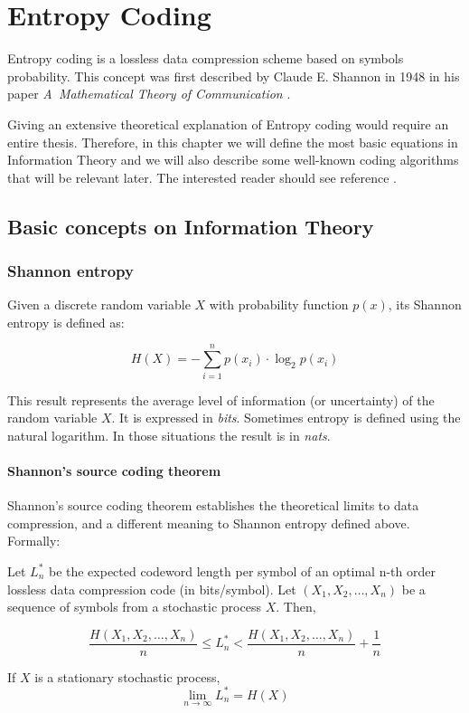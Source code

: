 \chapter{Entropy Coding}
Entropy coding is a lossless data compression scheme based on symbols probability. This concept was first described by Claude E. Shannon in 1948 in his paper \textit{A~Mathematical Theory of Communication} \parencite{Shannon1948}.

Giving an extensive theoretical explanation of Entropy coding would require an entire thesis. Therefore, in this chapter we will define the most basic equations in Information Theory and we will also describe some well-known coding algorithms that will be relevant later. The interested reader should see reference \parencite{cover}.

\section{Basic concepts on Information Theory}
\subsection{Shannon entropy}
Given a discrete random variable $X$ with probability function $p(x)$, its Shannon entropy is defined as:

\begin{equation}
H(X) = - \sum_{i=1}^{n} p(x_i) \cdot \log_2 p(x_i) 
\end{equation}

This result represents the average level of information (or uncertainty) of the random variable $X$. It is expressed in \textit{bits}. Sometimes entropy is defined using the natural logarithm. In those situations the result is in \textit{nats}.

\subsubsection{Shannon's source coding theorem}
Shannon's source coding theorem establishes the theoretical limits to data compression, and a different meaning to Shannon entropy defined above. Formally:

\begin{theorem}
Let $L_n^*$ be the expected codeword length per symbol of an optimal n-th order lossless data compression code (in bits/symbol). Let $(X_1, X_2, \dots, X_n )$ be a sequence of symbols from a stochastic process $X$. Then,

\begin{equation}
	\frac{H(X_1, X_2, \dots, X_n )}{n} \leq L_n^* < \frac{H(X_1, X_2, \dots, X_n )}{n} + \frac{1}{n}
\end{equation}

If $X$ is a stationary stochastic process,
\begin{equation}
	\lim_{n \to \infty} L_n^* = H(X)
\end{equation}
\end{theorem}

